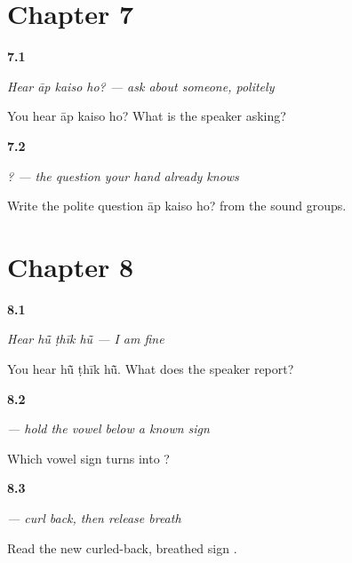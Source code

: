 \section*{Chapter 7}

\noindent\begin{minipage}[t]{\linewidth}
\raggedright
\hypertarget{review-MW-C06-hear-question-meaning}{\textbf{7.1}} \emph{Hear \emph{āp kaiso ho?} — ask about someone, politely}\par
\small You hear āp kaiso ho? What is the speaker asking?
\end{minipage}\par\medskip

\noindent\begin{minipage}[t]{\linewidth}
\raggedright
\hypertarget{review-MW-C06-question-write}{\textbf{7.2}} \emph{  ? — the question your hand already knows}\par
\small Write the polite question āp kaiso ho? from the sound groups.
\end{minipage}\par\medskip

\section*{Chapter 8}

\noindent\begin{minipage}[t]{\linewidth}
\raggedright
\hypertarget{review-MW-C06-hear-answer-meaning}{\textbf{8.1}} \emph{Hear \emph{hū̃ ṭhīk hū̃} — I am fine}\par
\small You hear hū̃ ṭhīk hū̃. What does the speaker report?
\end{minipage}\par\medskip

\noindent\begin{minipage}[t]{\linewidth}
\raggedright
\hypertarget{review-MW-W06-uu-matra-build}{\textbf{8.2}} \emph{ — hold the vowel below a known sign}\par
\small Which vowel sign turns  into ?
\end{minipage}\par\medskip

\noindent\begin{minipage}[t]{\linewidth}
\raggedright
\hypertarget{review-MW-W06-ttha-read}{\textbf{8.3}} \emph{ — curl back, then release breath}\par
\small Read the new curled-back, breathed sign .
\end{minipage}\par\medskip

